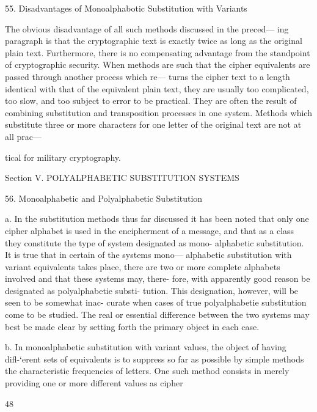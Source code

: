 55. Disadvantages of Monoalphabotic Substitution with Variants

The obvious disadvantage of all such methods discussed in the preced—
ing paragraph is that the cryptographic text is exactly twice as long as
the original plain text. Furthermore, there is no compensating advantage
from the standpoint of cryptographic security. When methods are such
that the cipher equivalents are passed through another process which re—
turns the cipher text to a length identical with that of the equivalent plain
text, they are usually too complicated, too slow, and too subject to error
to be practical. They are often the result of combining substitution and
transposition processes in one system. Methods which substitute three
or more characters for one letter of the original text are not at all prac—

tical for military cryptography.

Section V. POLYALPHABETIC SUBSTITUTION
SYSTEMS

56. Monoalphabetic and Polyalphabetic Substitution

a. In the substitution methods thus far discussed it has been noted that
only one cipher alphabet is used in the encipherment of a message, and
that as a class they constitute the type of system designated as mono-
alphabetic substitution. It is true that in certain of the systems mono—
alphabetic substitution with variant equivalents takes place, there are two
or more complete alphabets involved and that these systems may, there-
fore, with apparently good reason be designated as polyalphabetie substi-
tution. This designation, however, will be seen to be somewhat inac-
curate when cases of true polyalphabetie substitution come to be studied.
The real or essential difference between the two systems may best be
made clear by setting forth the primary object in each case.

b. In monoalphabetic substitution with variant values, the object of
having diﬂ-‘erent sets of equivalents is to suppress so far as possible by
simple methods the characteristic frequencies of letters. One such method
consists in merely providing one or more different values as cipher

48

 

 

